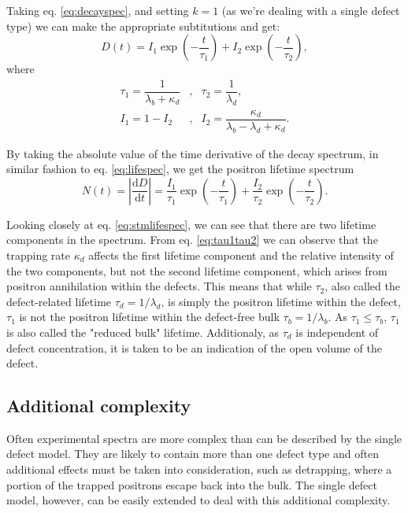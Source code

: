Taking eq. \ref{eq:decayspec}, and setting $k=1$ (as we're dealing with a single defect type) we can make the appropriate subtitutions and get:
\begin{equation}
    D(t) = I_1\exp\left(-\frac{t}{\tau_1}\right) + I_2 \exp \left(-\frac{t}{\tau_2}\right),
\end{equation}
where
\begin{equation}
    \begin{array}{lcl}
        \tau_1 = \dfrac{1}{\lambda_b+\kappa_d} &,& \tau_2 = \dfrac{1}{\lambda_d}, \\
        I_1 = 1 - I_2                          &,& I_2 = \dfrac{\kappa_d}{\lambda_b - \lambda_d + \kappa_d}.
    \end{array}
    \label{eq:tau1tau2}
\end{equation}

By taking the absolute value of the time derivative of the decay spectrum, in similar fashion to eq. \ref{eq:lifespec}, we get the positron lifetime spectrum
\begin{equation}
    N(t) = \left|\frac{\mathrm{d}D}{\mathrm{d}t}\right| = 
    \frac{I_1}{\tau_1} \exp \left(-\frac{t}{\tau_1}\right) +
    \frac{I_2}{\tau_2} \exp \left(-\frac{t}{\tau_2}\right).
    \label{eq:stmlifespec}
\end{equation}

Looking closely at eq. \ref{eq:stmlifespec}, we can see that there are two lifetime components in the spectrum. From eq. \ref{eq:tau1tau2} we can observe that the trapping rate $\kappa_d$ affects the first lifetime component and the relative intensity of the two components, but not the second lifetime component, which arises from positron annihilation within the defects. 
This means that while $\tau_2$, also called the defect-related lifetime $\tau_d = 1/\lambda_d$, is simply the positron lifetime within the defect, $\tau_1$ is not the positron lifetime within the defect-free bulk $\tau_b = 1/\lambda_b$. As $\tau_1 \leq \tau_b$, $\tau_1$ is also called the "reduced bulk" lifetime. Additionaly, as $\tau_d$ is independent of defect concentration, it is taken to be an indication of the open volume of the defect.

\subsection{Additional complexity}

Often experimental spectra are more complex than can be described by the single defect model. They are likely to contain more than one defect type and often additional effects must be taken into consideration, such as detrapping, where a portion of the trapped positrons escape back into the bulk. The single defect model, however, can be easily extended to deal with this additional complexity.

